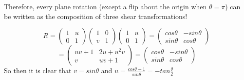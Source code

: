 \documentclass[12pt]{article}
\begin{document}
\medskip
Therefore, every plane rotation (except a flip about the origin when 
$\theta = \pi$) can be written as the composition of three
shear transformations!

$$R = \begin{pmatrix}
1 & u \\ 0 & 1
\end{pmatrix} \begin{pmatrix}
1 & 0 \\ v & 1
\end{pmatrix}\begin{pmatrix}
1 & u \\ 0 & 1
\end{pmatrix} = \begin{pmatrix}
cos \theta & -sin \theta \\ sin \theta & cos \theta
\end{pmatrix}$$
$$ = \begin{pmatrix}
uv +1 & 2u + u^2v \\ v & uv +1
\end{pmatrix}= \begin{pmatrix}
cos \theta & -sin \theta \\ sin \theta & cos \theta
\end{pmatrix}$$
So then it is clear that $v = sin\theta$ and $u = \frac{cos\theta - 1}{sin \theta} = -tan \frac{\theta}{2}$
\end{document}
